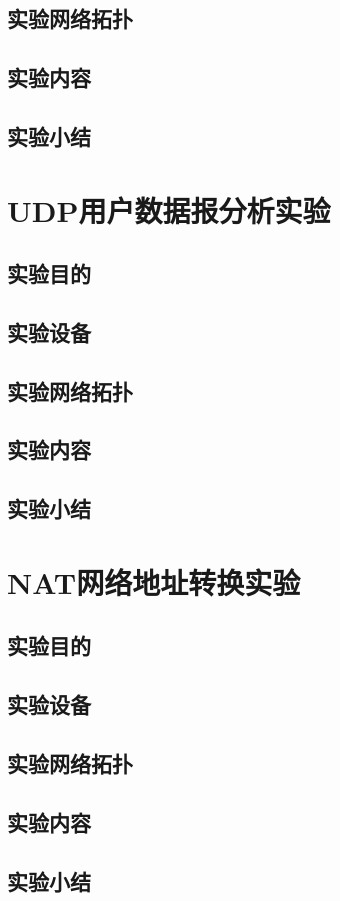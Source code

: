 \documentclass[lang=cn,11pt,a4paper,cite=authoryear]{elegantpaper}
\begin{document}
\subsection{实验网络拓扑}
\subsection{实验内容}
\subsection{实验小结}
\section{UDP用户数据报分析实验}
\subsection{实验目的}
\subsection{实验设备}
\subsection{实验网络拓扑}
\subsection{实验内容}
\subsection{实验小结}
\section{NAT网络地址转换实验}
\subsection{实验目的}
\subsection{实验设备}
\subsection{实验网络拓扑}
\subsection{实验内容}
\subsection{实验小结}
\end{document}
